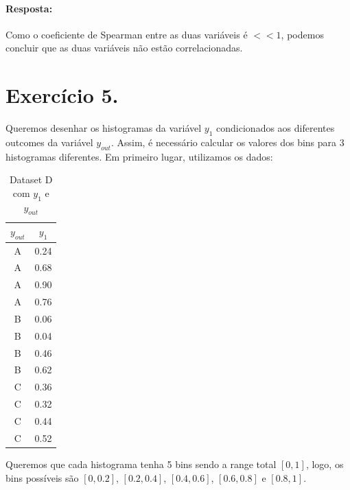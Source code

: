 \documentclass{article}
\begin{document}
\paragraph{Resposta: }Como o coeficiente de Spearman entre as duas variáveis é $<< 1$, podemos concluir que as duas variáveis não estão correlacionadas.

\newpage

\section{Exercício 5.}

Queremos desenhar os histogramas da variável $y_1$ condicionados aos diferentes outcomes da variável $y_{out}$. 
Assim, é necessário calcular os valores dos bins para 3 histogramas diferentes. Em primeiro lugar, utilizamos os dados:

\begin{table}[H]
  \centering
  \begin{tabular}{|c|c|}
    \hline
    $y_{out}$ & $y_1$ \\ \hline
    A         & 0.24  \\ \hline
    A         & 0.68  \\ \hline
    A         & 0.90  \\ \hline
    A         & 0.76  \\ \hline
    B         & 0.06  \\ \hline
    B         & 0.04  \\ \hline
    B         & 0.46  \\ \hline
    B         & 0.62  \\ \hline
    C         & 0.36  \\ \hline
    C         & 0.32  \\ \hline
    C         & 0.44  \\ \hline
    C         & 0.52  \\ \hline
  \end{tabular}
  \caption{Dataset D com $y_1$ e $y_{out}$}
  \label{tab:datasetD_y1_yout}
\end{table}

Queremos que cada histograma tenha 5 bins sendo a range total $[0,1]$, logo, os bins possíveis são $[0, 0.2]$, $[0.2, 0.4]$, $[0.4, 0.6]$, $[0.6, 0.8]$ e $[0.8, 1]$.
\end{document}

